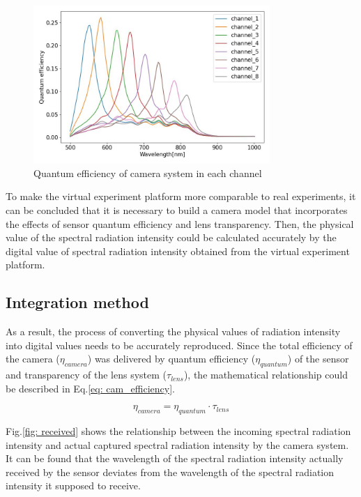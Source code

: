 \begin{figure}[htbp]
    \centering
    \includegraphics[width = 0.8\textwidth]{figures/quantum_efficiency.jpg}
    \caption{Quantum efficiency of camera system in each channel}
    \label{fig: quantum_efficiency}
\end{figure}


To make the virtual experiment platform more comparable to real experiments, 
it can be concluded that it is necessary to build a camera model that 
incorporates the effects of sensor quantum efficiency and lens transparency.
Then, the physical value of the spectral radiation intensity could be 
calculated accurately by the digital value of spectral radiation intensity obtained from the virtual experiment 
platform.


\subsection{Integration method}
As a result, the process of converting the physical values of radiation intensity 
into digital values needs to be accurately reproduced. Since the total efficiency 
of the camera (${\eta}_{camera}$) was delivered by quantum efficiency (${\eta}_{quantum}$)
of the sensor and transparency of the lens system ($\tau_{lens}$), the mathematical
relationship could be described in Eq.\ref{eq: cam_efficiency}.


\begin{equation}
    \label{eq: cam_efficiency}
    {\eta}_{camera} = {\eta}_{quantum} \cdot \tau_{lens}
\end{equation}


Fig.\ref{fig: received} shows the relationship between the incoming spectral 
radiation intensity and actual captured spectral radiation intensity 
by the camera system. It can be found that the wavelength of the spectral 
radiation intensity actually received by the sensor deviates from the wavelength of the 
spectral radiation intensity it supposed to receive.


